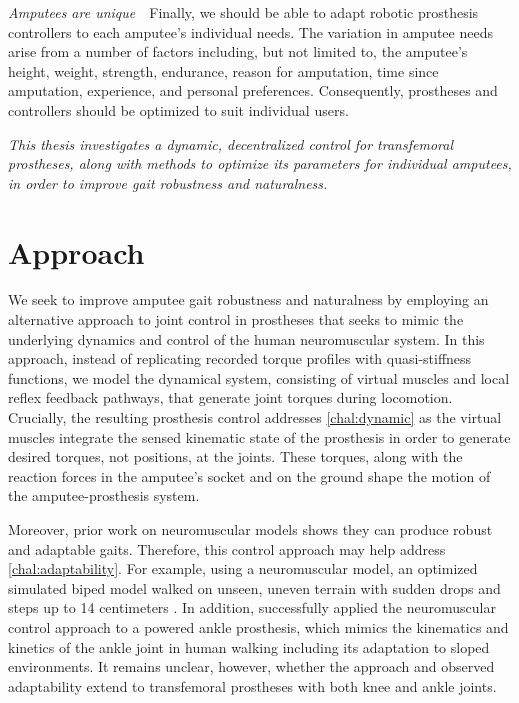 \begin{challenges}
    \item\label{chal:amputees_unique} \emph{Amputees are unique}~~Finally, we
    should be able to adapt robotic prosthesis controllers to each amputee's
    individual needs. The variation in amputee needs arise from a number of
    factors including, but not limited to, the amputee's height, weight,
    strength, endurance, reason for amputation, time since amputation,
    experience, and personal preferences. Consequently, prostheses and
    controllers should be optimized to suit individual users.
\end{challenges}

\begin{fullwidth} 
\emph{This thesis investigates a dynamic, decentralized control for transfemoral
prostheses, along with methods to optimize its parameters for individual
amputees, in order to improve gait robustness and naturalness.} 
\end{fullwidth}

\section{Approach}\label{sec:intro_approach}

We seek to improve amputee gait robustness and naturalness by employing an
alternative approach to joint control in prostheses that seeks to mimic the
underlying dynamics and control of the human neuromuscular system. In this
approach, instead of replicating recorded torque profiles with quasi-stiffness
functions, we model the dynamical system, consisting of virtual muscles and
local reflex feedback pathways, that generate joint torques during locomotion.
Crucially, the resulting prosthesis control addresses \cref{chal:dynamic} as the
virtual muscles integrate the sensed kinematic state of the prosthesis in order
to generate desired torques, not positions, at the joints. These torques, along
with the reaction forces in the amputee's socket and on the ground shape the
motion of the amputee-prosthesis system.

Moreover, prior work on neuromuscular models shows they can produce robust and
adaptable gaits. Therefore, this control approach may help address
\cref{chal:adaptability}. For example, using a neuromuscular model, an optimized
simulated biped model walked on unseen, uneven terrain with sudden drops and
steps up to 14 centimeters \citep{song2015neural}. In addition,
\citet{eilenberg2010control} successfully applied the neuromuscular control
approach to a powered ankle prosthesis, which mimics the kinematics and kinetics
of the ankle joint in human walking including its adaptation to sloped
environments.  It remains unclear, however, whether the approach and observed
adaptability extend to transfemoral prostheses with both knee and ankle joints.

